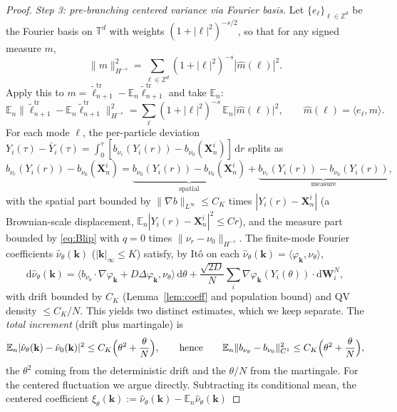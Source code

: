 \documentclass[a4paper,fleqn]{cas-sc}
\theoremstyle{definition}
\theoremstyle{remark}
\begin{document}
\begin{proof}
\emph{Step 3: pre-branching centered variance via Fourier basis.} Let
$\{e_\ell\}_{\ell\in\mathbb Z^d}$ be the Fourier basis on $\mathbb T^d$ with
weights $(1+|\ell|^2)^{-s/2}$, so that for any signed measure $m$,
\[
\|m\|_{H^{-s}}^2=\sum_{\ell\in\mathbb Z^d}(1+|\ell|^2)^{-s}|\hat m(\ell)|^2.
\]
Apply this to $m=\tilde\ell^{\mathrm{tr}}_{n+1}-\mathbb E_n\tilde\ell^{\mathrm{tr}}_{n+1}$
and take $\mathbb E_n$:
\[
\mathbb E_n\|\tilde\ell^{\mathrm{tr}}_{n+1}-\mathbb E_n\tilde\ell^{\mathrm{tr}}_{n+1}\|_{H^{-s}}^2
=\sum_{\ell}(1+|\ell|^2)^{-s}\,\mathbb E_n\bigl|\hat m(\ell)\bigr|^2,
\qquad
\hat m(\ell)=\langle e_\ell,m\rangle.
\]
For each mode $\ell$, the per-particle deviation
$Y_i(\tau)-\bar Y_i(\tau)=\int_0^\tau[b_{\nu_r}(Y_i(r))-b_{\nu_0}(\mathbf X^i_n)]\,\mathrm dr$
splits as
\begin{equation}\label{eq:disp-split}
b_{\nu_r}(Y_i(r))-b_{\nu_0}(\mathbf X^i_n)
=\underbrace{b_{\nu_0}(Y_i(r))-b_{\nu_0}(\mathbf X^i_n)}_{\text{spatial}}
+\underbrace{b_{\nu_r}(Y_i(r))-b_{\nu_0}(Y_i(r))}_{\text{measure}},
\end{equation}
with the spatial part bounded by $\|\nabla b\|_{L^\infty}\le C_K$ times
$|Y_i(r)-\mathbf X^i_n|$ (a Brownian-scale displacement,
$\mathbb E_n|Y_i(r)-\mathbf X^i_n|^2\le Cr$), and the measure part bounded by
\eqref{eq:Blip} with $q=0$ times $\|\nu_r-\nu_0\|_{H^{-s}}$. The finite-mode
Fourier coefficients $\hat\nu_\theta(\mathbf k)$ ($|\mathbf k|_\infty\le K$)
satisfy, by It\^o on each $\hat\nu_\theta(\mathbf k)=\langle\varphi_{\mathbf k},\nu_\theta\rangle$,
\[
\mathrm d\hat\nu_\theta(\mathbf k)
=\langle b_{\nu_\theta}\!\cdot\!\nabla\varphi_{\mathbf k}+D\Delta\varphi_{\mathbf k},\nu_\theta\rangle\,\mathrm d\theta
+\frac{\sqrt{2D}}N\sum_{i}\nabla\varphi_{\mathbf k}(Y_i(\theta))\!\cdot\!\mathrm d\mathbf W^N_i,
\]
with drift bounded by $C_K$ (Lemma~\ref{lem:coeff} and population bound) and QV
density $\le C_K/N$. This yields two distinct estimates, which we keep separate.
The \emph{total increment} (drift plus martingale) is
\begin{equation}\label{eq:b-fluct}
\mathbb E_n|\hat\nu_\theta(\mathbf k)-\hat\nu_0(\mathbf k)|^2\le C_K\Bigl(\theta^2+\frac\theta N\Bigr),
\qquad\text{hence}\qquad
\mathbb E_n\|b_{\nu_\theta}-b_{\nu_0}\|_{C^1}^2\le C_K\Bigl(\theta^2+\frac\theta N\Bigr),
\end{equation}
the $\theta^2$ coming from the deterministic drift and the $\theta/N$ from the
martingale. For the centered fluctuation we argue directly. Subtracting its
conditional mean, the centered coefficient
$\xi_\theta(\mathbf k):=\hat\nu_\theta(\mathbf k)-\mathbb E_n\hat\nu_\theta(\mathbf k)$

\end{proof}
\end{document}
